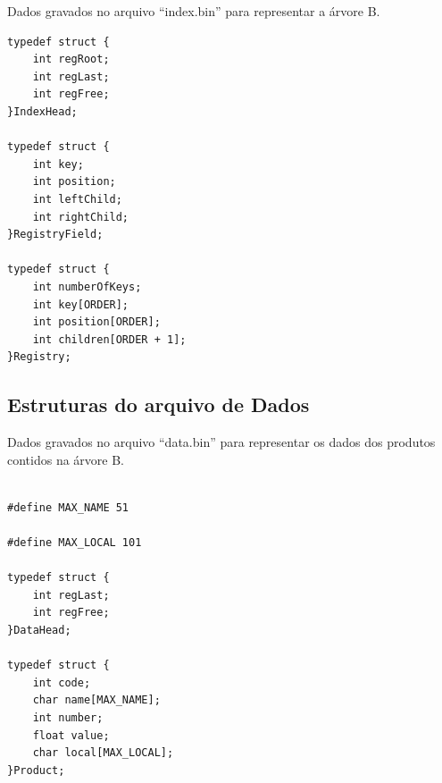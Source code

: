 \documentclass[12pt, a4paper]{article}
\begin{document}
Dados gravados no arquivo ``index.bin'' para representar a árvore B.

\begin{lstlisting}
typedef struct {
    int regRoot;
    int regLast;
    int regFree;
}IndexHead;

typedef struct {
    int key;
    int position;
    int leftChild;
    int rightChild;
}RegistryField;

typedef struct {
    int numberOfKeys;
	int key[ORDER];
	int position[ORDER];
	int children[ORDER + 1];
}Registry;
\end{lstlisting}

\cleardoublepage
\subsection{Estruturas do arquivo de Dados}\label{Estruturas do arquivo de Dados}

Dados gravados no arquivo ``data.bin'' para representar os dados dos produtos contidos na árvore B.

\begin{lstlisting}

#define MAX_NAME 51

#define MAX_LOCAL 101

typedef struct {
    int regLast;
    int regFree;
}DataHead;

typedef struct {
    int code;
    char name[MAX_NAME];
    int number;
    float value;
    char local[MAX_LOCAL];
}Product;

\end{lstlisting}
\end{document}
